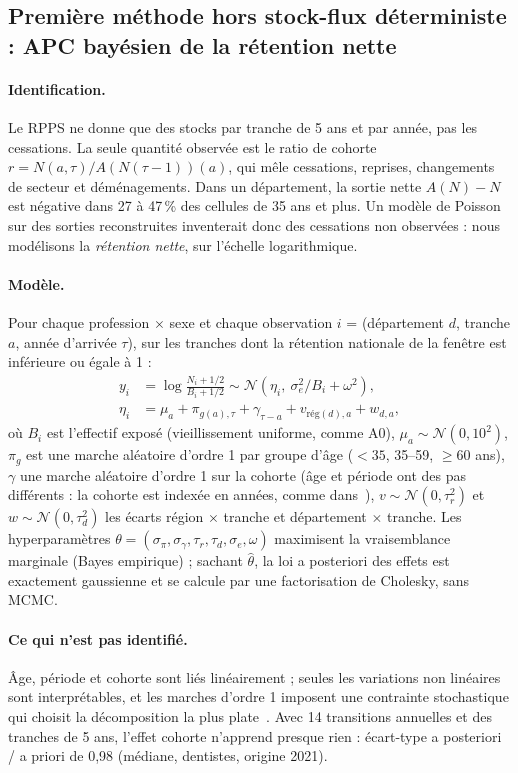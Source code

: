 \documentclass[11pt]{article}
\begin{document}
\subsection{Première méthode hors stock-flux déterministe : APC bayésien de la rétention nette}
\label{sec:apc}
\paragraph{Identification.} Le RPPS ne donne que des stocks par tranche de 5 ans et par année, pas les
cessations. La seule quantité observée est le ratio de cohorte
$r = N(a, \tau) / A(N(\tau-1))(a)$, qui mêle cessations, reprises, changements de secteur et
déménagements. Dans un département, la sortie nette $A(N) - N$ est négative dans 27 à 47\,\%\mesure{}
des cellules de 35 ans et plus. Un modèle de Poisson sur des sorties reconstruites inventerait donc
des cessations non observées : nous modélisons la \emph{rétention nette}, sur l'échelle logarithmique.

\paragraph{Modèle.} Pour chaque profession $\times$ sexe et chaque observation $i$ = (département $d$,
tranche $a$, année d'arrivée $\tau$), sur les tranches dont la rétention nationale de la fenêtre est
inférieure ou égale à 1 :
\begin{align}
  y_i &= \log\frac{N_i + 1/2}{B_i + 1/2} \sim \mathcal N\!\left(\eta_i,\ \sigma_e^2 / B_i + \omega^2\right),\\
  \eta_i &= \mu_a + \pi_{g(a),\tau} + \gamma_{\tau - a} + v_{\text{rég}(d),a} + w_{d,a},
\end{align}
où $B_i$ est l'effectif exposé (vieillissement uniforme, comme A0), $\mu_a \sim \mathcal N(0, 10^2)$,
$\pi_g$ est une marche aléatoire d'ordre 1 par groupe d'âge ($<35$, 35--59, $\ge 60$ ans),
$\gamma$ une marche aléatoire d'ordre 1 sur la cohorte (âge et période ont des pas différents : la
cohorte est indexée en années, comme dans~\cite{schmid2007bamp}), $v \sim \mathcal N(0,\tau_r^2)$ et
$w \sim \mathcal N(0, \tau_d^2)$ les écarts région $\times$ tranche et département $\times$ tranche.
Les hyperparamètres $\theta = (\sigma_\pi, \sigma_\gamma, \tau_r, \tau_d, \sigma_e, \omega)$ maximisent
la vraisemblance marginale (Bayes empirique) ; sachant $\hat\theta$, la loi a posteriori des effets
est exactement gaussienne et se calcule par une factorisation de Cholesky, sans MCMC.

\paragraph{Ce qui n'est pas identifié.} Âge, période et cohorte sont liés linéairement ; seules les
variations non linéaires sont interprétables, et les marches d'ordre 1 imposent une contrainte
stochastique qui choisit la décomposition la plus plate~\cite{schmid2007bamp}. Avec 14 transitions
annuelles et des tranches de 5 ans, l'effet cohorte n'apprend presque rien : écart-type a posteriori /
a priori de 0,98\mesure{} (médiane, dentistes, origine 2021).
\end{document}
